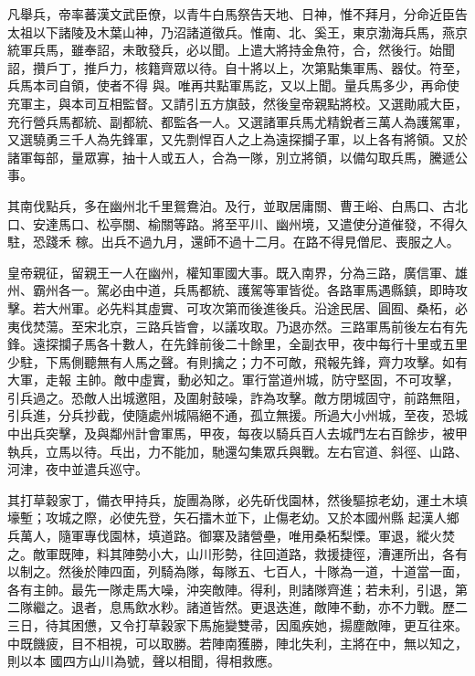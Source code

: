 \begin{pinyinscope}
 凡舉兵，帝率蕃漢文武臣僚，以青牛白馬祭告天地、日神，惟不拜月，分命近臣告太祖以下諸陵及木葉山神，乃沼諸道徵兵。惟南、北、奚王，東京渤海兵馬，燕京統軍兵馬，雖奉詔，未敢發兵，必以聞。上遣大將持金魚符，合，然後行。始聞詔，攢戶丁，推戶力，核籍齊眾以待。自十將以上，次第點集軍馬、器仗。符至，兵馬本司自領，使者不得
 與。唯再共點軍馬訖，又以上聞。量兵馬多少，再命使充軍主，與本司互相監督。又請引五方旗鼓，然後皇帝親點將校。又選勛戚大臣，充行營兵馬都統、副都統、都監各一人。又選諸軍兵馬尤精銳者三萬人為護駕軍，又選驍勇三千人為先鋒軍，又先剽悍百人之上為遠探攔子軍，以上各有將領。又於諸軍每部，量眾寡，抽十人或五人，合為一隊，別立將領，以備勾取兵馬，騰遞公事。



 其南伐點兵，多在幽州北千里鴛鴦泊。及行，並取居庸關、曹王峪、白馬口、古北口、安達馬口、松亭關、榆關等路。將至平川、幽州境，又遣使分道催發，不得久駐，恐踐禾
 稼。出兵不過九月，還師不過十二月。在路不得見僧尼、喪服之人。



 皇帝親征，留親王一人在幽州，權知軍國大事。既入南界，分為三路，廣信軍、雄州、霸州各一。駕必由中道，兵馬都統、護駕等軍皆從。各路軍馬遇縣鎮，即時攻擊。若大州軍。必先料其虛實、可攻次第而後進後兵。沿途民居、圓囿、桑柘，必夷伐焚蕩。至宋北京，三路兵皆會，以議攻取。乃退亦然。三路軍馬前後左右有先鋒。遠探攔子馬各十數人，在先鋒前後二十餘里，全副衣甲，夜中每行十里或五里少駐，下馬側聽無有人馬之聲。有則擒之；力不可敵，飛報先鋒，齊力攻擊。如有大軍，走報
 主帥。敵中虛實，動必知之。軍行當道州城，防守堅固，不可攻擊，引兵過之。恐敵人出城邀阻，及圍射鼓噪，詐為攻擊。敵方閉城固守，前路無阻，引兵進，分兵抄截，使隨處州城隔絕不通，孤立無援。所過大小州城，至夜，恐城中出兵突擊，及與鄰州計會軍馬，甲夜，每夜以騎兵百人去城門左右百餘步，被甲執兵，立馬以待。乓出，力不能加，馳還勾集眾兵與戰。左右官道、斜徑、山路、河津，夜中並遣兵巡守。



 其打草穀家丁，備衣甲持兵，旋團為隊，必先斫伐園林，然後驅掠老幼，運土木填壕塹；攻城之際，必使先登，矢石擂木並下，止傷老幼。又於本國州縣
 起漢人鄉兵萬人，隨軍專伐園林，填道路。御寨及諸營壘，唯用桑柘梨慄。軍退，縱火焚之。敵軍既陣，料其陣勢小大，山川形勢，往回道路，救援捷徑，漕運所出，各有以制之。然後於陣四面，列騎為隊，每隊五、七百人，十隊為一道，十道當一面，各有主帥。最先一隊走馬大噪，沖突敵陣。得利，則諸隊齊進；若未利，引退，第二隊繼之。退者，息馬飲水粆。諸道皆然。更退迭進，敵陣不動，亦不力戰。歷二三日，待其困憊，又令打草穀家下馬施變雙帚，因風疾她，揚塵敵陣，更互往來。中既饑疲，目不相視，可以取勝。若陣南獲勝，陣北失利，主將在中，無以知之，則以本
 國四方山川為號，聲以相聞，得相救應。




\end{pinyinscope}
